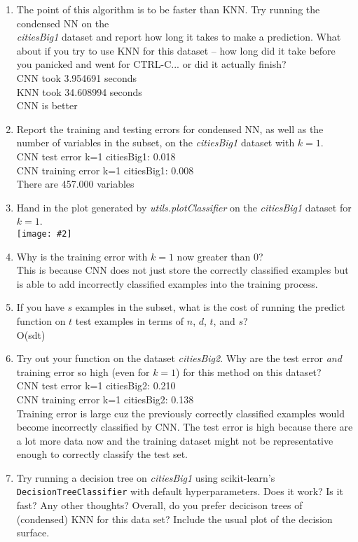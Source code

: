 \documentclass{article}
\def\blu#1{{\color{blu}#1}}
\newcommand{\fig}[2]{\texttt{[image: \#2]}}
\def\enum#1{\begin{enumerate}#1\end{enumerate}}
\begin{document}
\blu{
\enum{
\item The point of this algorithm is to be faster than KNN. Try running the condensed NN on the\\\emph{citiesBig1} dataset and report how long it takes to make a prediction. What about if you try to use KNN for this dataset -- how long did it take before you panicked and went for CTRL-C... or did it actually finish?\\
CNN took 3.954691 seconds\\
KNN took 34.608994 seconds\\
CNN is better\\
\item Report the training and testing errors for condensed NN, as well as the number of variables in the subset, on the \emph{citiesBig1} dataset with $k=1$.\\
CNN test error k=1 citiesBig1: 0.018\\
CNN training error k=1 citiesBig1: 0.008\\
There are 457.000 variables\\
\item Hand in the plot generated by \emph{utils.plotClassifier} on the \emph{citiesBig1} dataset for $k=1$.\\
\fig{0.5}{../figs/q4_2_CNN}
\item Why is the training error with $k=1$ now greater than $0$?\\
This is because CNN does not just store the correctly classified examples but is able to add incorrectly classified examples into the training process.
\item If you have $s$ examples in the subset, what is the cost of running the predict function on $t$ test examples in terms of $n$, $d$, $t$, and $s$?\\
O(sdt)
\item Try out your function on the dataset \emph{citiesBig2}. Why are the  test error \emph{and} training error so high (even for $k=1$) for this method on this dataset?\\
CNN test error k=1 citiesBig2: 0.210\\
CNN training error k=1 citiesBig2: 0.138\\
Training error is large cuz the previously correctly classified examples would become incorrectly classified by CNN. The test error is high because there are a lot more data now and the training dataset might not be representative enough to correctly classify the test set.
\item Try running a decision tree on \emph{citiesBig1} using scikit-learn's \texttt{DecisionTreeClassifier} with default hyperparameters. Does it work? Is it fast? Any other thoughts? Overall, do you prefer decicison trees of (condensed) KNN for this data set? Include the usual plot of the decision surface. \\
}}
\end{document}
